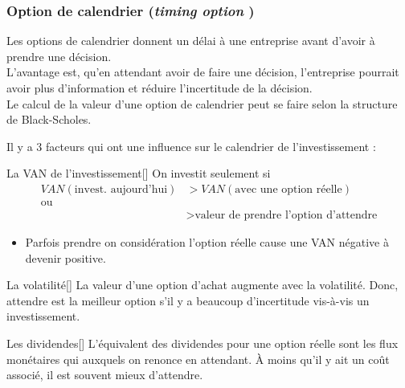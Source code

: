 \documentclass[10pt, french]{article}
\begin{document}
\begin{multicols*}{2}
\columnbreak
\subsubsection{Option de calendrier (\og \textit{timing option} \fg{})}
\begin{rappel_enhanced}[Contexte]
Les options de calendrier donnent un délai à une entreprise avant d'avoir à prendre une décision.\\

L'avantage est, qu'en attendant avoir de faire une décision, l'entreprise pourrait avoir plus d'information et réduire l'incertitude de la décision. \\

Le calcul de la valeur d'une option de calendrier peut se faire selon la structure de Black-Scholes.
\end{rappel_enhanced}

Il y a 3 facteurs qui ont une influence sur le calendrier de l'investissement :
\begin{definitionGENERAL}{La VAN de l'investissement}[]
On investit seulement si 
\begin{align*}
	VAN(\text{invest. aujourd'hui}) 
	&> VAN(\text{avec une option réelle})	\\
	\text{ou}	\\
	&>	\text{valeur de prendre l'option d'attendre}
\end{align*}
			
\begin{itemize}
	\item	Parfois prendre on considération l'option réelle cause une VAN négative à devenir positive.
\end{itemize}
\end{definitionGENERAL}

\begin{definitionGENERAL}{La volatilité}[]
La valeur d'une option d'achat augmente avec la volatilité. Donc, attendre est la meilleur option s'il y a beaucoup d'incertitude vis-à-vis un investissement.
\end{definitionGENERAL}

\begin{definitionGENERAL}{Les dividendes}[]
L'équivalent des dividendes pour une option réelle sont les flux monétaires qui auxquels on renonce en attendant. À moins qu'il y ait un coût associé, il est souvent mieux d'attendre.
\end{definitionGENERAL}



\end{multicols*}
\end{document}
